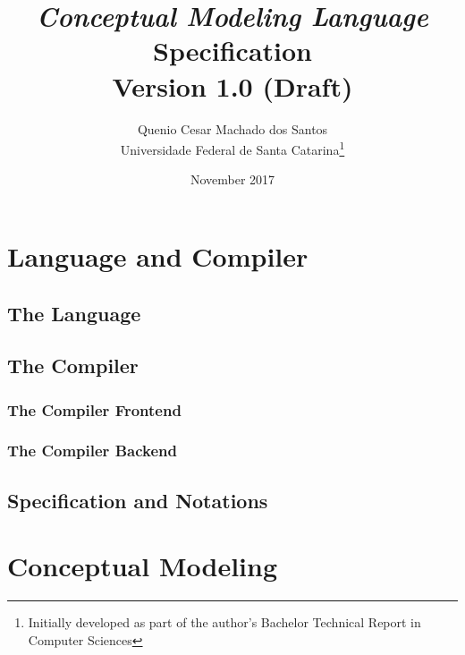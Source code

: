 \documentclass[a4paper,oneside,12pt, extrafontsizes]{memoir}
\title{\emph{Conceptual Modeling Language}\\Specification\\ \small{Version 1.0 (Draft)}}
\author{Quenio Cesar Machado dos Santos\\
\small{Universidade Federal de Santa Catarina}\thanks{
Initially developed as part of the author's Bachelor Technical Report in Computer Sciences}}
\date{November 2017}
\begin{document}
\begin{titlingpage}
\maketitle
\end{titlingpage}

\frontmatter

\begin{KeepFromToc}

\clearpage
\tableofcontents

\clearpage
\listofcodes

\clearpage
\listoffigures

\clearpage
\listoftables

\end{KeepFromToc}

\mainmatter

\part{Language and Compiler}

  \chapter{The Language}
  

  \chapter{The Compiler}
  

    \section[The Frontend]{The Compiler Frontend}
    \label{sec:frontend}
    

    \section[The Backend]{The Compiler Backend}
    \label{sec:backend}
    

  \chapter{Specification and Notations}
  \label{ch:notations}
  

\part{Conceptual Modeling}
\end{document}
